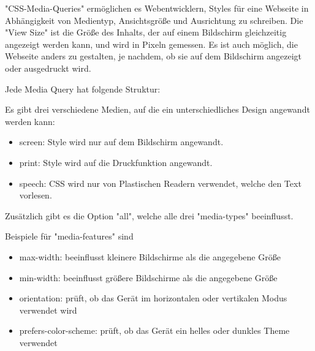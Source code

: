 \label{sec:mediaQueries}

"CSS-Media-Queries" ermöglichen es Webentwicklern, Styles für eine Webseite in Abhängigkeit von Medientyp, Ansichtsgröße und Ausrichtung zu schreiben. 
Die "View Size" ist die Größe des Inhalts, der auf einem Bildschirm gleichzeitig angezeigt werden kann, und wird in Pixeln gemessen. 
Es ist auch möglich, die Webseite anders zu gestalten, je nachdem, ob sie auf dem Bildschirm angezeigt oder ausgedruckt wird. 

\begin{minipage}{\textwidth}
    Jede Media Query hat folgende Struktur:
    
\end{minipage}

Es gibt drei verschiedene Medien, auf die ein unterschiedliches Design angewandt werden kann: 
\begin{itemize}
    \item screen: Style wird nur auf dem Bildschirm angewandt.
    \item print: Style wird auf die Druckfunktion angewandt.
    \item speech: CSS wird nur von Plastischen Readern verwendet, welche den Text vorlesen.
\end{itemize}

Zusätzlich gibt es die Option "all", welche alle drei "media-types" beeinflusst. \cite{w3MediaQueries}

Beispiele für "media-features" sind

\begin{itemize}
    \item max-width: beeinflusst kleinere Bildschirme als die angegebene Größe
    \item min-width: beeinflusst größere Bildschirme als die angegebene Größe 
    \item orientation: prüft, ob das Gerät im horizontalen oder vertikalen Modus verwendet wird
    \item prefers-color-scheme: prüft, ob das Gerät ein helles oder dunkles Theme verwendet
\end{itemize}
